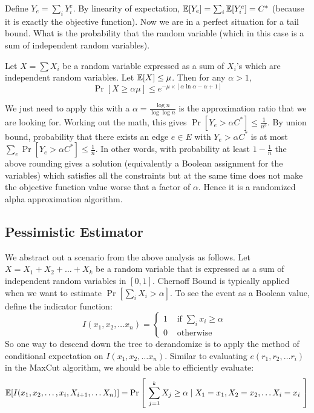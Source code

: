 \noindent Define $Y_e = \sum_{i} Y_i^e$. By linearity of expectation, ${\mathbb E}[Y_e] = \sum_i {\mathbb E}[Y_i^e] = C^*$ (because it is exactly the objective function). Now we are in a perfect situation for a tail bound. What is the probability that the random variable (which in this case is a sum of independent random variables). 

\begin{proposition}
Let $X = \sum X_i$ be a random variable expressed as a sum of $X_i$'s which are independent random variables. Let ${\mathbb E}[X] \le \mu$. Then for any $\alpha > 1$, 
$$\Pr\left[ X \ge \alpha \mu \right] \le e^{-\mu \times [\alpha \ln \alpha - \alpha + 1]}$$
\end{proposition}
We just need to apply this with a $\alpha = \frac{\log n}{\log \log n}$ is the approximation ratio that we are looking for. Working out the math, this gives $\Pr[Y_e > \alpha C^*] \le \frac{1}{n^3}$. By union bound, probability that there exists an edge $e \in E$ with $Y_e > \alpha C^*$ is at most $\sum_e \Pr[ Y_e > \alpha C^*] \le \frac{1}{n}$. In other words, with probability at least $1-\frac{1}{n}$ the above rounding gives a solution (equivalently a Boolean assignment for the variables) which satisfies all the constraints but at the same time does not make the objective function value worse that a factor of $\alpha$. Hence it is a randomized alpha approximation algorithm.

\subsection{Pessimistic Estimator}

We abstract out a scenario from the above analysis as follows. 
Let $X = X_1 + X_2 + \ldots + X_k$ be a random variable that is expressed as a sum of independent random variables in $[0,1]$.
Chernoff Bound is typically applied when we want to estimate $\Pr[\sum_i X_i > \alpha]$. To see the event as a Boolean value, define the indicator function:
$$I(x_1, x_2, \ldots x_n) = 
\begin{cases}
1 & \textrm{ if $\sum_i x_i \ge \alpha$ } \\
0 & \textrm{ otherwise }
\end{cases}
$$
So one way to descend down the tree to derandomize is to apply the method of conditional expectation on $I(x_1, x_2, \ldots x_n)$. Similar to evaluating $e(r_1, r_2, \ldots r_i)$ in the {\sc MaxCut} algorithm, we should be able to efficiently evaluate:
$${\mathbb E}[I(x_1, x_2, \ldots, x_i, X_{i+1}, \ldots X_n)] = \Pr\left[ ~\sum_{j=1}^k X_j \ge \alpha \mid X_1 = x_1, X_2 = x_2, \ldots X_i = x_i~\right]$$

